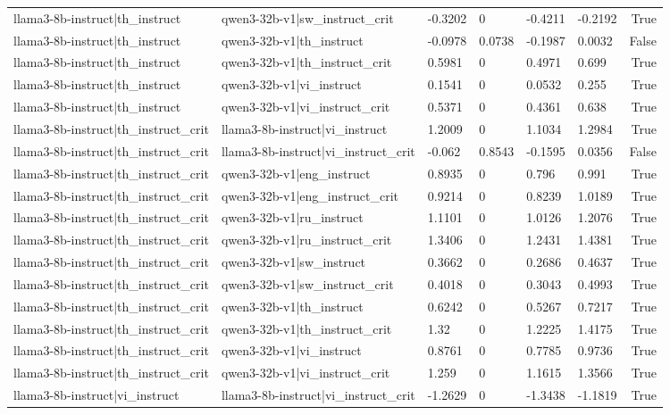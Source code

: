 \begin{table}
\begin{tabular}{llllllr}
llama3-8b-instruct|th_instruct & qwen3-32b-v1|sw_instruct_crit & -0.3202 & 0 & -0.4211 & -0.2192 & True \\
llama3-8b-instruct|th_instruct & qwen3-32b-v1|th_instruct & -0.0978 & 0.0738 & -0.1987 & 0.0032 & False \\
llama3-8b-instruct|th_instruct & qwen3-32b-v1|th_instruct_crit & 0.5981 & 0 & 0.4971 & 0.699 & True \\
llama3-8b-instruct|th_instruct & qwen3-32b-v1|vi_instruct & 0.1541 & 0 & 0.0532 & 0.255 & True \\
llama3-8b-instruct|th_instruct & qwen3-32b-v1|vi_instruct_crit & 0.5371 & 0 & 0.4361 & 0.638 & True \\
llama3-8b-instruct|th_instruct_crit & llama3-8b-instruct|vi_instruct & 1.2009 & 0 & 1.1034 & 1.2984 & True \\
llama3-8b-instruct|th_instruct_crit & llama3-8b-instruct|vi_instruct_crit & -0.062 & 0.8543 & -0.1595 & 0.0356 & False \\
llama3-8b-instruct|th_instruct_crit & qwen3-32b-v1|eng_instruct & 0.8935 & 0 & 0.796 & 0.991 & True \\
llama3-8b-instruct|th_instruct_crit & qwen3-32b-v1|eng_instruct_crit & 0.9214 & 0 & 0.8239 & 1.0189 & True \\
llama3-8b-instruct|th_instruct_crit & qwen3-32b-v1|ru_instruct & 1.1101 & 0 & 1.0126 & 1.2076 & True \\
llama3-8b-instruct|th_instruct_crit & qwen3-32b-v1|ru_instruct_crit & 1.3406 & 0 & 1.2431 & 1.4381 & True \\
llama3-8b-instruct|th_instruct_crit & qwen3-32b-v1|sw_instruct & 0.3662 & 0 & 0.2686 & 0.4637 & True \\
llama3-8b-instruct|th_instruct_crit & qwen3-32b-v1|sw_instruct_crit & 0.4018 & 0 & 0.3043 & 0.4993 & True \\
llama3-8b-instruct|th_instruct_crit & qwen3-32b-v1|th_instruct & 0.6242 & 0 & 0.5267 & 0.7217 & True \\
llama3-8b-instruct|th_instruct_crit & qwen3-32b-v1|th_instruct_crit & 1.32 & 0 & 1.2225 & 1.4175 & True \\
llama3-8b-instruct|th_instruct_crit & qwen3-32b-v1|vi_instruct & 0.8761 & 0 & 0.7785 & 0.9736 & True \\
llama3-8b-instruct|th_instruct_crit & qwen3-32b-v1|vi_instruct_crit & 1.259 & 0 & 1.1615 & 1.3566 & True \\
llama3-8b-instruct|vi_instruct & llama3-8b-instruct|vi_instruct_crit & -1.2629 & 0 & -1.3438 & -1.1819 & True \\

\end{tabular}
\end{table}
